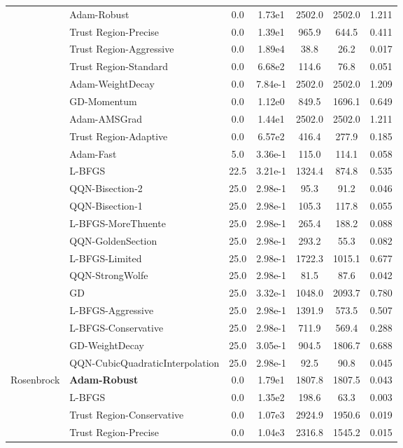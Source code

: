\documentclass{article}
\begin{document}
\begin{table}[htbp]
{\begin{tabular}{p{2.5cm}p{2.5cm}*{5}{c}}
 & Adam-Robust & 0.0 & 1.73e1 & 2502.0 & 2502.0 & 1.211 \\
 & Trust Region-Precise & 0.0 & 1.39e1 & 965.9 & 644.5 & 0.411 \\
 & Trust Region-Aggressive & 0.0 & 1.89e4 & 38.8 & 26.2 & 0.017 \\
 & Trust Region-Standard & 0.0 & 6.68e2 & 114.6 & 76.8 & 0.051 \\
 & Adam-WeightDecay & 0.0 & 7.84e-1 & 2502.0 & 2502.0 & 1.209 \\
 & GD-Momentum & 0.0 & 1.12e0 & 849.5 & 1696.1 & 0.649 \\
 & Adam-AMSGrad & 0.0 & 1.44e1 & 2502.0 & 2502.0 & 1.211 \\
 & Trust Region-Adaptive & 0.0 & 6.57e2 & 416.4 & 277.9 & 0.185 \\
 & Adam-Fast & 5.0 & 3.36e-1 & 115.0 & 114.1 & 0.058 \\
 & L-BFGS & 22.5 & 3.21e-1 & 1324.4 & 874.8 & 0.535 \\
 & QQN-Bisection-2 & 25.0 & 2.98e-1 & 95.3 & 91.2 & 0.046 \\
 & QQN-Bisection-1 & 25.0 & 2.98e-1 & 105.3 & 117.8 & 0.055 \\
 & L-BFGS-MoreThuente & 25.0 & 2.98e-1 & 265.4 & 188.2 & 0.088 \\
 & QQN-GoldenSection & 25.0 & 2.98e-1 & 293.2 & 55.3 & 0.082 \\
 & L-BFGS-Limited & 25.0 & 2.98e-1 & 1722.3 & 1015.1 & 0.677 \\
 & QQN-StrongWolfe & 25.0 & 2.98e-1 & 81.5 & 87.6 & 0.042 \\
 & GD & 25.0 & 3.32e-1 & 1048.0 & 2093.7 & 0.780 \\
 & L-BFGS-Aggressive & 25.0 & 2.98e-1 & 1391.9 & 573.5 & 0.507 \\
 & L-BFGS-Conservative & 25.0 & 2.98e-1 & 711.9 & 569.4 & 0.288 \\
 & GD-WeightDecay & 25.0 & 3.05e-1 & 904.5 & 1806.7 & 0.688 \\
 & QQN-CubicQuadraticInterpolation & 25.0 & 2.98e-1 & 92.5 & 90.8 & 0.045 \\
\midrule
\multirow{25}{*}{Rosenbrock} & \textbf{Adam-Robust} & 0.0 & 1.79e1 & 1807.8 & 1807.5 & 0.043 \\
 & L-BFGS & 0.0 & 1.35e2 & 198.6 & 63.3 & 0.003 \\
 & Trust Region-Conservative & 0.0 & 1.07e3 & 2924.9 & 1950.6 & 0.019 \\
 & Trust Region-Precise & 0.0 & 1.04e3 & 2316.8 & 1545.2 & 0.015 \\

\end{tabular}}
\end{table}
\end{document}
